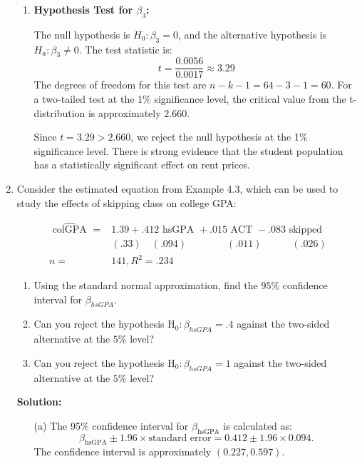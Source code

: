 \documentclass[12pt]{article}
\begin{document}
\begin{enumerate}
{\begin{enumerate}
    \item \textbf{Hypothesis Test for \(\beta_3\):}

    The null hypothesis is \( H_0: \beta_3 = 0 \), and the alternative hypothesis is \( H_a: \beta_3 \neq 0 \). The test statistic is:
    \[
    t = \frac{0.0056}{0.0017} \approx 3.29
    \]
    The degrees of freedom for this test are \( n - k - 1 = 64 - 3 - 1 = 60 \). For a two-tailed test at the 1\% significance level, the critical value from the t-distribution is approximately \( 2.660 \).

    Since \( t = 3.29 > 2.660 \), we reject the null hypothesis at the 1\% significance level. There is strong evidence that the student population has a statistically significant effect on rent prices.


\end{enumerate}

}



\item Consider the estimated equation from Example 4.3, which can be used to study the effects of skipping class on college GPA:

$$
\begin{aligned}
\widehat{\text { colGPA }}= & 1.39+.412 \text { hsGPA }+.015 \text { ACT }-.083 \text { skipped } \\
& (.33)\quad(.094)\quad\quad\quad\quad(.011)\quad\quad\quad(.026) \\
n= & 141, R^2=.234
\end{aligned}
$$
\begin{enumerate}
    \item  Using the standard normal approximation, find the $95 \%$ confidence interval for $\beta_{h s G P A}$.
\item Can you reject the hypothesis $\mathrm{H}_0: \beta_{h s G P A}=.4$ against the two-sided alternative at the $5 \%$ level?
\item Can you reject the hypothesis $\mathrm{H}_0: \beta_{h s G P A}=1$ against the two-sided alternative at the $5 \%$ level?
\end{enumerate}


{\color{blue}
\noindent \textbf{Solution:}

\begin{enumerate}
    \item[(a)] The 95\% confidence interval for \( \beta_{\text{hsGPA}} \) is calculated as:
    \[
    \beta_{\text{hsGPA}} \pm 1.96 \times \text{standard error} = 0.412 \pm 1.96 \times 0.094.
    \]
    The confidence interval is approximately \( (0.227, 0.597) \).


\end{enumerate}}
\end{enumerate}
\end{document}
